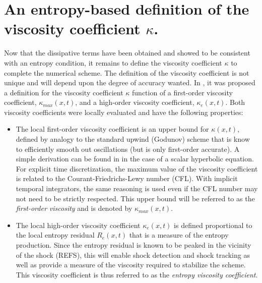 \documentclass[times,doublespace]{fldauth}%
\begin{document}
\section{An entropy-based definition of the viscosity coefficient $\kappa$.}\label{sec:def-visc-coeff}
%
Now that the dissipative terms have been obtained and showed to be consistent with an entropy condition, it remains to 
define the viscosity coefficient $\kappa$ to complete the numerical scheme. The definition of the viscosity coefficient is not unique and will depend upon the degree of accuracy wanted. In \cite{our_jcp_radhy_paper}, it was proposed a definition for the viscosity coefficient $\kappa$ function of a first-order viscosity coefficient, $\kappa_{max}(x,t)$, and a high-order viscosity coefficient, $\kappa_e(x,t)$. Both viscosity coefficients were locally evaluated and have the following properties:
\begin{itemize}
\item The local first-order viscosity coefficient is an upper bound for $\kappa(x,t)$, defined by analogy to the standard upwind (Godunov) scheme that is know to efficiently smooth out oscillations (but is only first-order accurate). A simple derivation can be found in \cite{jlg1} in the case of a scalar hyperbolic equation. For explicit time discretization, the maximum value of the viscosity coefficient is related to the Courant-Friedrichs-Lewy number (CFL). With implicit temporal integrators, the same reasoning is used even if the CFL number may not need to be strictly respected. This upper bound will be referred to as the \emph{first-order viscosity} and is denoted by $\kappa_{max}(x,t)$.  
\item The local high-order viscosity coefficient $\kappa_e(x,t)$ is defined proportional to the local entropy residual $R_e(x,t)$ that is a measure of the entropy production. Since the entropy residual is known to be peaked in the vicinity of the shock (REFS), this will enable shock detection and shock tracking as well as provide a measure of the viscosity required to stabilize the scheme. This viscosity coefficient is thus referred to as the \emph{entropy viscosity coefficient}.
\end{itemize}
\end{document}
